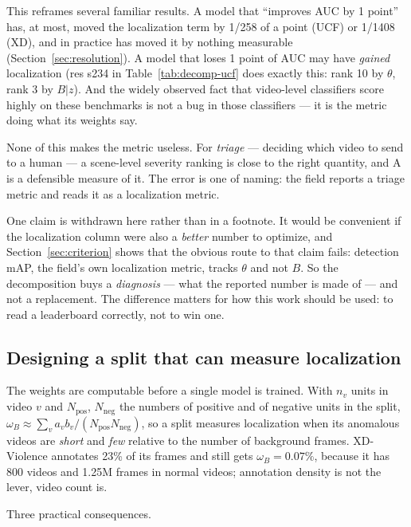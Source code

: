 \documentclass[number,preprint,12pt]{elsarticle}
\begin{document}
This reframes several familiar results. A model that ``improves AUC by 1 point''
has, at most, moved the localization term by 1/258 of a point (UCF) or 1/1408
(XD), and in practice has moved it by nothing measurable (Section~\ref{sec:resolution}). A model that
loses 1 point of AUC may have \emph{gained} localization (res s234 in Table~\ref{tab:decomp-ucf} does
exactly this: rank 10 by \(\theta\), rank 3 by \(B|z\)). And the widely observed fact that
video-level classifiers score highly on these benchmarks is not a bug in those
classifiers --- it is the metric doing what its weights say.

None of this makes the metric useless. For \emph{triage} --- deciding which video to
send to a human --- a scene-level severity ranking is close to the right quantity,
and A is a defensible measure of it. The error is one of naming: the field
reports a triage metric and reads it as a localization metric.

One claim is withdrawn here rather than in a footnote. It would be convenient if
the localization column were also a \emph{better} number to optimize, and
Section~\ref{sec:criterion} shows that the obvious route to that claim fails:
detection mAP, the field's own localization metric, tracks \(\theta\) and not \(B\).
So the decomposition buys a \emph{diagnosis} --- what the reported number is made of
--- and not a replacement. The difference matters for how this work should be
used: to read a leaderboard correctly, not to win one.

\subsection{Designing a split that can measure localization}\label{sec:design}

The weights are computable before a single model is trained. With \(n_v\) units in
video \(v\) and \(N_{\mathrm{pos}}\), \(N_{\mathrm{neg}}\) the numbers of positive and of
negative units in the split,
\(\omega_B\approx\sum_v a_v b_v/(N_{\mathrm{pos}}N_{\mathrm{neg}})\), so a split measures localization
when its anomalous videos are \emph{short} and \emph{few} relative to the number of
background frames. XD-Violence annotates 23\% of its frames and still gets
\(\omega_B=0.07\%\), because it has 800 videos and 1.25M frames in normal videos; annotation
density is not the lever, video count is.

Three practical consequences.
\end{document}
